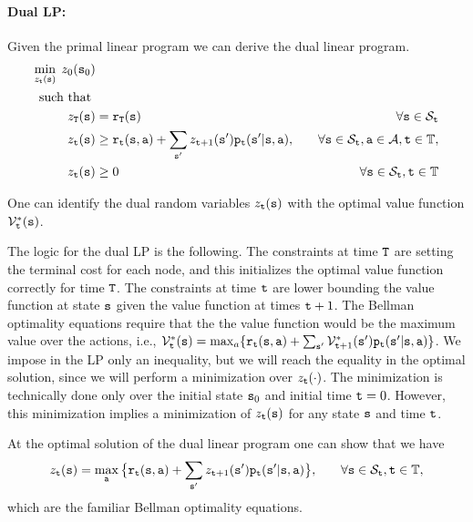 \paragraph{Dual LP:}
Given the primal linear program we can derive the dual linear
program.
\begin{align*}
\min_{z_{\tt t}({\tt s})}  \;z_0({\tt s}_0)&\\
\mbox{ such that }\\
z_{{\tt T}}({\tt s}) &= {\tt r}_{{\tt T}}({\tt s}) &\quad\forall
{\tt s} \in {\mathcal{S}_{{\tt t}}}\\
 z_{{\tt t}}({\tt s}) &\geq
{\tt r}_{{\tt t}}({\tt s},{\tt a}) + \sum_{{\tt s}'}z_{{\tt t} +
1}({\tt s}'){\tt p}_{{\tt t}}({\tt s}'|{\tt s},{\tt a}) , &\quad\forall {\tt s}
\in {\mathcal{S}_{{\tt t}}},{\tt a}\in\mathcal{A}, {\tt t}\in\mathbb{T},\\ 
 z_{{\tt t}}({\tt s}) &\geq 0 &\quad\forall {\tt s}
\in {\mathcal{S}_{{\tt t}}},{\tt t}\in\mathbb{T}
\end{align*}

One can identify the dual random variables $z_{\tt t}({\tt s})$ with
the optimal value function $\mathcal{V}^*_{\tt t}({\tt s})$. 

The logic for the dual LP is the following.
The constraints at time ${\tt T}$ are setting the terminal cost for each node, and this initializes the optimal value function correctly for time ${\tt T}$.
The constraints at time ${\tt t}$ are lower bounding the value function at state ${\tt s}$ given the value function at times ${\tt t}+1$. The Bellman optimality equations require that the the value function would be the maximum value over the actions, i.e., $\mathcal{V}_{\tt t}^*({\tt s})=\max_a \{{\tt r}_{{\tt t}}({\tt s},{\tt a}) + \sum_{{\tt s}'}\mathcal{V}^*_{{\tt t} +
1}({\tt s}'){\tt p}_{{\tt t}}({\tt s}'|{\tt s},{\tt a})\}$. We impose in the LP only an inequality, but we will reach the equality in the optimal solution, since we will perform a minimization over $z_{\tt t}(\cdot)$. 
The minimization is technically done only over the initial state ${\tt s}_0$ and initial time ${\tt t}=0$. However, this minimization implies a minimization of  $z_{\tt t}({\tt s})$ for any state ${\tt s}$ and time ${\tt t}$. 

At the optimal
solution of the dual linear program one can show that we have
\begin{align*}
 z_{{\tt t}}({\tt s}) &= \max_{\tt a} \big\{
{\tt r}_{{\tt t}}({\tt s},{\tt a}) + \sum_{{\tt s}'}z_{{\tt t} +
1}({\tt s}'){\tt p}_{{\tt t}}({\tt s}'|{\tt s},{\tt a}) \big\} , &\quad\forall
{\tt s} \in {\mathcal{S}_{{\tt t}}}, {\tt t}\in\mathbb{T},
\end{align*}
which are the familiar Bellman optimality equations.

